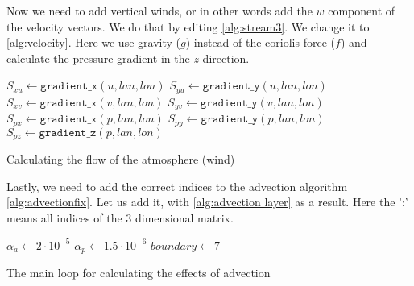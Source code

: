 Now we need to add vertical winds, or in other words add the $w$ component of the velocity vectors. We do that by editing \autoref{alg:stream3}. We change it to \autoref{alg:velocity}. Here we 
use gravity ($g$) instead of the coriolis force ($f$) and calculate the pressure gradient in the $z$ direction.

\begin{algorithm}
    $S_{xu} \leftarrow \texttt{gradient\_x}(u, lan, lon)$ \;
    $S_{yu} \leftarrow \texttt{gradient\_y}(u, lan, lon)$ \;
    $S_{xv} \leftarrow \texttt{gradient\_x}(v, lan, lon)$ \;
    $S_{yv} \leftarrow \texttt{gradient\_y}(v, lan, lon)$ \;
    $S_{px} \leftarrow \texttt{gradient\_x}(p, lan, lon)$ \;
    $S_{py} \leftarrow \texttt{gradient\_y}(p, lan, lon)$ \;
    $S_{pz} \leftarrow \texttt{gradient\_z}(p, lan, lon)$ \;
    \caption{Calculating the flow of the atmosphere (wind)}
    \label{alg:velocity}
\end{algorithm}

Lastly, we need to add the correct indices to the advection algorithm \autoref{alg:advectionfix}. Let us add it, with \autoref{alg:advection layer} as a result. Here the ':' means all indices 
of the 3 dimensional matrix.

\begin{algorithm}
    $\alpha_a \leftarrow 2 \cdot 10^{-5}$ \;
    $\alpha_p \leftarrow 1.5 \cdot 10^{-6}$ \;
    $boundary \leftarrow 7$ \;
    \caption{The main loop for calculating the effects of advection}
    \label{alg:advection layer}
\end{algorithm}